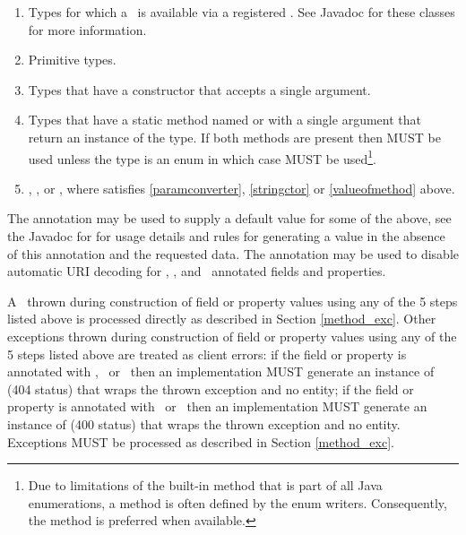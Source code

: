 \begin{enumerate}
\item\label{paramconverter} Types for which a \ParamConverter\ is available via a registered \ParamConverterProvider. See Javadoc for these classes for more information.
\item Primitive types.
\item\label{stringctor} Types that have a constructor that accepts a single  argument.
\item\label{valueofmethod} Types that have a static method named  or  with a single  argument that return an instance of the type. If both methods are present then  MUST be used unless the type is an enum in which case  MUST be used\footnote{Due to limitations of the built-in  method that is part of all Java enumerations, a  method is often defined by the enum writers. Consequently, the  method is preferred when available.}.
\item {}, , or , where  satisfies \ref{paramconverter}, \ref{stringctor} or \ref{valueofmethod} above.
\end{enumerate}

The  annotation may be used to supply a default value for some of the above, see the Javadoc for  for usage details and rules for generating a value in the absence of this annotation and the requested data. The  annotation may be used to disable automatic URI decoding for \MatrixParam, \QueryParam, and \PathParam\ annotated fields and properties.

A \WebAppExc\ thrown during construction of field or property values using any of the 5 steps listed above is processed directly as described in Section \ref{method_exc}. Other exceptions thrown during construction of field or property values using any of the 5 steps listed above are treated as client errors: if the field or property is annotated with \MatrixParam, \QueryParam\ or \PathParam\ then an implementation MUST generate an instance of  (404 status) that wraps the thrown exception and no entity; if the field or property is annotated with \HeaderParam\ or \CookieParam\ then an implementation MUST generate an instance of  (400 status) that wraps the thrown exception and no entity. Exceptions MUST be processed as described in Section \ref{method_exc}.

